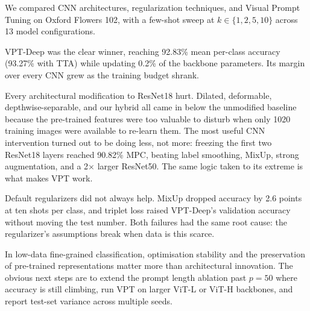 We compared CNN architectures, regularization techniques, and Visual Prompt Tuning on Oxford Flowers 102, with a few-shot sweep at $k \in \{1, 2, 5, 10\}$ across 13 model configurations.

VPT-Deep was the clear winner, reaching 92.83\% mean per-class accuracy (93.27\% with TTA) while updating 0.2\% of the backbone parameters. Its margin over every CNN grew as the training budget shrank.

Every architectural modification to ResNet18 hurt. Dilated, deformable, depthwise-separable, and our hybrid all came in below the unmodified baseline because the pre-trained features were too valuable to disturb when only 1020 training images were available to re-learn them. The most useful CNN intervention turned out to be doing less, not more: freezing the first two ResNet18 layers reached 90.82\% MPC, beating label smoothing, MixUp, strong augmentation, and a 2$\times$ larger ResNet50. The same logic taken to its extreme is what makes VPT work.

Default regularizers did not always help. MixUp dropped accuracy by 2.6 points at ten shots per class, and triplet loss raised VPT-Deep's validation accuracy without moving the test number. Both failures had the same root cause: the regularizer's assumptions break when data is this scarce.

In low-data fine-grained classification, optimisation stability and the preservation of pre-trained representations matter more than architectural innovation. The obvious next steps are to extend the prompt length ablation past $p = 50$ where accuracy is still climbing, run VPT on larger ViT-L or ViT-H backbones, and report test-set variance across multiple seeds.
